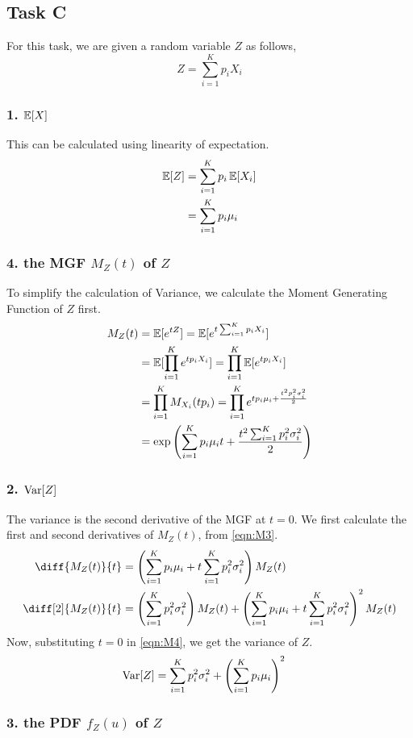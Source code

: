 \subsection{Task C}
For this task, we are given a random variable $Z$ as follows,
\[Z = \sum_{i=1}^K p_i X_i\]

\subsubsection*{1. $\operatorname{\mathbb{E}}[X]$}
This can be calculated using linearity of expectation.
\begin{align*}
	\operatorname{\mathbb{E}}[Z] & = \sum_{i=1}^K p_i \operatorname{\mathbb{E}}[X_i] \\
	       & = \sum_{i=1}^K p_i \mu_i
\end{align*}

\subsubsection*{4. \normalfont the MGF $M_Z(t)$ of $Z$}
To simplify the calculation of Variance, we calculate the Moment Generating Function of $Z$ first.
\begin{align}
	M_Z(t) & = \operatorname{\mathbb{E}}[e^{tZ}] \nonumber
	= \operatorname{\mathbb{E}}[e^{t\sum_{i=1}^K p_i X_i}] \nonumber                                                                          \\
	       & = \operatorname{\mathbb{E}}[\prod_{i=1}^K e^{tp_i X_i}] \nonumber
	= \prod_{i=1}^K \operatorname{\mathbb{E}}[e^{tp_i X_i}] \nonumber                                                                         \\
	       & = \prod_{i=1}^K M_{X_i}(tp_i) \nonumber
	= \prod_{i=1}^K e^{tp_i \mu_i + \frac{t^2 p_i^2 \sigma_i^2}{2}}\nonumber                                            \\
	       & = \exp\left({\sum_{i=1}^K p_i \mu_i t + \frac{t^2 \sum_{i=1}^K p_i^2 \sigma_i^2}{2}} \right)\label{eqn:M3}
\end{align}

\subsubsection*{2. $\operatorname{Var}[Z]$}
The variance is the second derivative of the MGF at $t=0$.
We first calculate the first and second derivatives of $M_Z(t)$, from \cref{eqn:M3}.
\begin{align}
	\diff{M_Z(t)}{t}    & = \left(\sum_{i=1}^K p_i \mu_i + t \sum_{i=1}^K p_i^2 \sigma_i^2 \nonumber\right) M_Z(t)                                                         \\
	\diff[2]{M_Z(t)}{t} & = \left(\sum_{i=1}^K p_i^2 \sigma_i^2\right) M_Z(t) + \left(\sum_{i=1}^K p_i \mu_i + t\sum_{i=1}^Kp_i^2\sigma_i^2\right)^2 M_Z(t) \label{eqn:M4}
\end{align}
Now, substituting $t=0$ in \cref{eqn:M4}, we get the variance of $Z$.
\begin{align}
	\operatorname{Var}[Z] & = \sum_{i=1}^K p_i^2 \sigma_i^2 + \left(\sum_{i=1}^K p_i \mu_i\right)^2 \label{eqn:V4}
\end{align}

\subsubsection*{3. \normalfont the PDF $f_Z(u)$ of $Z$}

